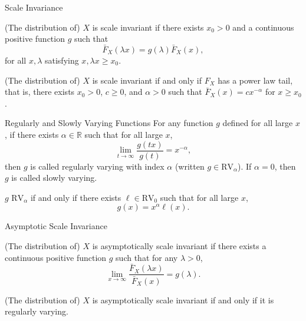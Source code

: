 \documentclass{beamer}
\def\R{\mathbb R}
\def\RV{\text{RV}}
\begin{document}
\begin{frame}{Scale Invariance}
    \begin{definition}
        (The distribution of) $X$ is scale invariant if there exists $x_0 > 0$ and a continuous positive function $g$ such that
        \[
        \bar{F}_X(\lambda x) = g(\lambda)\bar{F}_X(x),
        \]
        for all $x, \lambda$ satisfying $x, \lambda x \ge x_0$.
    \end{definition}
    \begin{theorem}
        (The distribution of) $X$ is scale invariant if and only if $F_X$ has a power law tail, that is, there exists $x_0 > 0$, $c \ge 0$, and $\alpha > 0$ such that $\bar{F}_X(x) = c x^{-\alpha}$ for $x \ge x_0$.
    \end{theorem}
\end{frame}

\begin{frame}{Regularly and Slowly Varying Functions}
    For any function $g$ defined for all large $x$, if there exists $\alpha \in \R$ such that for all large $x$,
    \[
    \lim_{t \to \infty} \frac{g(t x)}{g(t)} = x^{-\alpha},
    \]
    then $g$ is called regularly varying with index $\alpha$ (written $g \in \RV_{\alpha}$). If $\alpha = 0$, then $g$ is called slowly varying.
    \begin{theorem}
        $g$ \in $\RV_{\alpha}$ if and only if there exists $\ell \in \RV_0$ such that for all large $x$,
        \[
        g(x) = x^{\alpha}\ell(x).
        \]
    \end{theorem}
\end{frame}

\begin{frame}{Asymptotic Scale Invariance}
    \begin{definition}
        (The distribution of) $X$ is asymptotically scale invariant if there exists a continuous positive function $g$ such that for any $\lambda > 0$,
        \[
        \lim_{x \to \infty} \frac{\bar{F}_X(\lambda x)}{\bar{F}_X(x)} = g(\lambda).
        \]
    \end{definition}
    \begin{theorem}
        (The distribution of) $X$ is asymptotically scale invariant if and only if it is regularly varying.
    \end{theorem}
\end{frame}
\end{document}
